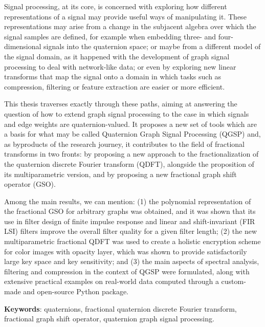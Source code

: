 
%

Signal processing, at its core, is concerned with exploring how different representations of a signal may provide useful ways of manipulating it. These representations may arise from a change in the subjacent algebra over which the signal samples are defined, for example when embedding three- and four-dimensional signals into the quaternion space; or maybe from a different model of the signal domain, as it happened with the development of graph signal processing to deal with network-like data; or even by exploring new linear transforms that map the signal onto a domain in which tasks such as compression, filtering or feature extraction are easier or more efficient.

This thesis traverses exactly through these paths, aiming at answering the question of how to extend graph signal processing to the case in which signals and edge weights are quaternion-valued. It proposes a new set of tools which are a basis for what may be called Quaternion Graph Signal Processing (QGSP) and, as byproducts of the research journey, it contributes to the field of fractional transforms in two fronts: by proposing a new approach to the fractionalization of the quaternion discrete Fourier transform (QDFT), alongside the proposition of its multiparametric version, and by proposing a new fractional graph shift operator (GSO).

Among the main results, we can mention: (1) the polynomial representation of the fractional GSO for arbitrary graphs was obtained, and it was shown that its use in filter design of finite impulse response and linear and shift-invariant (FIR LSI) filters improve the overall filter quality for a given filter length; (2) the new multiparametric fractional QDFT was used to create a holistic encryption scheme for color images with opacity layer, which was shown to provide satisfactorily large key space and key sensitivity; and (3) the main aspects of spectral analysis, filtering and compression in the context of QGSP were formulated, along with extensive practical examples on real-world data computed through a custom-made and open-source Python package.
\vspace{1em}

\noindent
\textbf{Keywords}: quaternions, fractional quaternion discrete Fourier transform, fractional graph shift operator, quaternion graph signal processing.
